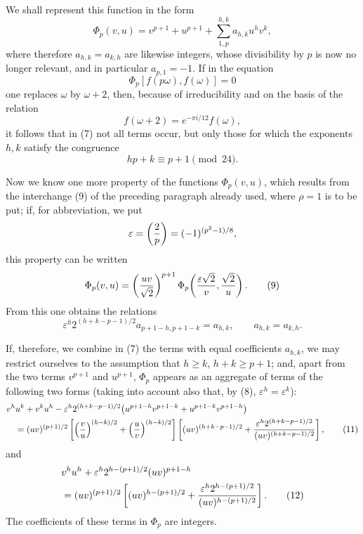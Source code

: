\documentclass[11pt]{article}
\begin{document}
We shall represent this function in the form
\begin{equation}
 \Phi_p(v,u)=v^{p+1}+u^{p+1}+\sum_{1,p}^{h,k} a_{h,k}u^hv^k,
\tag{7}
\end{equation}
where therefore $a_{h,k}=a_{k,h}$ are likewise integers, whose divisibility by $p$ is now no longer relevant, and in particular $a_{p,1}=-1$. If in the equation
\[
 \Phi_p[f(p\omega),f(\omega)]=0
\]
one replaces $\omega$ by $\omega+2$, then, because of irreducibility and on the basis of the relation
\[
 f(\omega+2)=e^{-\pi i/12}f(\omega),
\]
it follows that in (7) not all terms occur, but only those for which the exponents $h,k$ satisfy the congruence
\begin{equation}
 hp+k\equiv p+1\pmod{24}.
\tag{8}
\end{equation}

Now we know one more property of the functions $\Phi_p(v,u)$, which results from the interchange (9) of the preceding paragraph already used, where $\rho=1$ is to be put; if, for abbreviation, we put
\[
 \varepsilon=\left({2\over p}\right)=(-1)^{(p^2-1)/8},
\]
this property can be written
\begin{equation}
 \Phi_p(v,u)=\left({uv\over\sqrt2}\right)^{p+1}
 \Phi_p\!\left({\varepsilon\sqrt2\over v},{\sqrt2\over u}\right).
\tag{9}
\end{equation}
From this one obtains the relations
\begin{equation}
 \varepsilon^h2^{(h+k-p-1)/2}a_{p+1-h,p+1-k}=a_{h,k},
 \qquad a_{h,k}=a_{k,h}.
\tag{10}
\end{equation}

If, therefore, we combine in (7) the terms with equal coefficients $a_{h,k}$, we may restrict ourselves to the assumption that $h\ge k$, $h+k\ge p+1$; and, apart from the two terms $v^{p+1}$ and $u^{p+1}$, $\Phi_p$ appears as an aggregate of terms of the following two forms (taking into account also that, by (8), $\varepsilon^h=\varepsilon^k$):
\begin{align}
& v^hu^k+v^ku^h
 -\varepsilon^h2^{(h+k-p-1)/2}
 \bigl(u^{p+1-h}v^{p+1-k}+u^{p+1-k}v^{p+1-h}\bigr)
\notag\\
&\quad=(uv)^{(p+1)/2}
 \left[\left({v\over u}\right)^{(h-k)/2}
       +\left({u\over v}\right)^{(h-k)/2}\right]
 \left[(uv)^{(h+k-p-1)/2}
       +{\varepsilon^h2^{(h+k-p-1)/2}\over(uv)^{(h+k-p-1)/2}}\right],
\tag{11}
\end{align}
and
\begin{align}
& v^hu^h+\varepsilon^h2^{h-(p+1)/2}(uv)^{p+1-h}
\notag\\
&
=(uv)^{(p+1)/2}
 \left[(uv)^{h-(p+1)/2}
       +{\varepsilon^h2^{h-(p+1)/2}\over(uv)^{h-(p+1)/2}}\right].
\tag{12}
\end{align}
The coefficients of these terms in $\Phi_p$ are integers.
\end{document}
